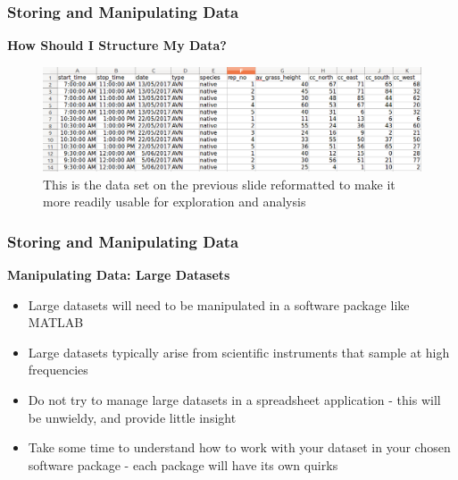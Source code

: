 \documentclass{beamer}
\begin{document}

\begin{frame}
\frametitle{Storing and Manipulating Data}
\textbf{How Should I Structure My Data?}\\
\vspace{0.5cm}
\begin{figure}
\includegraphics[scale=0.33]{good_structure}
\caption{This is the data set on the previous slide reformatted to make it more readily usable for exploration and analysis}
\end{figure}
\end{frame}


\begin{frame}
\frametitle{Storing and Manipulating Data}
\textbf{Manipulating Data: Large Datasets}\\
\vspace{0.5cm}
\begin{itemize}
\item Large datasets will need to be manipulated in a software package like MATLAB
\vspace{0.5cm}
\item Large datasets typically arise from scientific instruments that sample at high frequencies
\vspace{0.5cm}
\item Do not try to manage large datasets in a spreadsheet application - this will be unwieldy, and provide little insight
\vspace{0.5cm}
\item Take some time to understand how to work with your dataset in your chosen software package - each package will have its own quirks
\end{itemize}
\end{frame}

\end{document}
